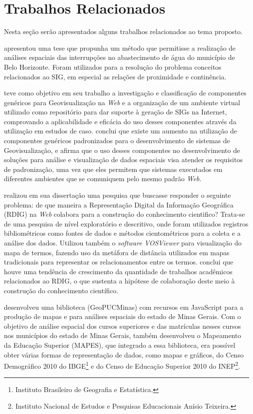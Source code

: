 \documentclass[12pt]{article}
\begin{document}
\section{Trabalhos Relacionados} \label{trabalhosre}

Nesta seção serão apresentados alguns trabalhos relacionados ao tema proposto.

\citet{cancado} apresentou uma tese que propunha um método que permitisse a realização de análises espaciais das interrupções no abastecimento de água do município de Belo Horizonte. Foram utilizados para a resolução do problema conceitos relacionados ao SIG, em especial as relações de proximidade e continência.

\citet{laudares} teve como objetivo em seu trabalho a investigação e classificação de componentes genéricos para Geovisualização na \emph{Web} e a organização de um ambiente virtual utilizado como repositório para dar suporte à geração de SIGs na Internet, comprovando a aplicabilidade e eficácia do uso desses componentes através da utilização em estudos de caso. \citeauthor{laudares} conclui que existe um aumento na utilização de componentes genéricos padronizados para o desenvolvimento de sistemas de Geovisualização, e afirma que o uso desses componentes no desenvolvimento de soluções para análise e visualização de dados espaciais visa atender os requisitos de padronização, uma vez que eles permitem que sistemas executados em diferentes ambientes que se comuniquem pelo mesmo padrão \emph{Web}.

\citet{santos} realizou em sua dissertação uma pesquisa que buscasse responder o seguinte problema: de que maneira a Representação Digital da Informação Geográfica (RDIG) na \emph{Web} colabora para a construção do conhecimento cientifico? Trata-se de uma pesquisa de nível exploratório e descritivo, onde foram utilizados registros bibliométricos como fontes de dados e métodos cientométricos para a coleta e a análise dos dados. Utilizou também o \emph{software VOSViewer} para visualização do mapa de termos, fazendo uso da metáfora de distância utilizados em mapas tradicionais para representar os relacionamentos entre os termos. \citeauthor{santos} conclui que houve uma tendência de crescimento da quantidade de trabalhos acadêmicos relacionados ao RDIG, o que sustenta a hipótese de colaboração deste meio à construção do conhecimento científico.

\citet{kutova} desenvolveu uma biblioteca (GeoPUCMinas) com recursos em JavaScript para a produção de mapas e para análises espaciais do estado de Minas Gerais. Com o objetivo de análise espacial dos cursos superiores e das matrículas nesses cursos nos municípios do estado de Minas Gerais, \citeauthor{kutova} também desenvolveu o Mapeamento da Educação Superior (MAPES), que integrado a essa biblioteca, era possível obter várias formas de representação de dados, como mapas e gráficos, do Censo Demográfico 2010 do IBGE\footnote{Instituto Brasileiro de Geografia e Estatística.} e do Censo de Educação Superior 2010 do INEP\footnote{Instituto Nacional de Estudos e Pesquisas Educacionais Anísio Teixeira.}.
\end{document}
